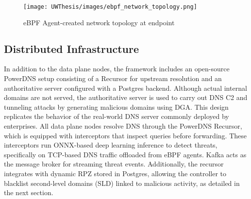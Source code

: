 \documentclass [11pt, proquest] {uwthesis}[2020/02/24]
\begin{document}
\begin{table}[htbp]
\centering
{}
\caption{eBPF Programs Managed by the eBPF Agent}
\label{sec:dp_kernel_prog_ty}
\end{table}

\begin{figure}[H]
\centering
\texttt{[image: UWThesis/images/ebpf\_network\_topology.png]}
\caption{eBPF Agent-created network topology at endpoint}
\label{sec:dp_eBPF_agent_net_topology}
\end{figure}

\subsection{Distributed Infrastructure}
In addition to the data plane nodes, the framework includes an open-source PowerDNS setup consisting of a Recursor for upstream resolution and an authoritative server configured with a Postgres backend. Although actual internal domains are not served, the authoritative server is used to carry out DNS C2 and tunneling attacks by generating malicious domains using DGA. This design replicates the behavior of the real-world DNS server commonly deployed by enterprises.
All data plane nodes resolve DNS through the PowerDNS Recursor, which is equipped with interceptors that inspect queries before forwarding. These interceptors run ONNX-based deep learning inference to detect threats, specifically on TCP-based DNS traffic offloaded from eBPF agents. Kafka acts as the message broker for streaming threat events. Additionally, the recursor integrates with dynamic RPZ stored in Postgres, allowing the controller to blacklist second-level domains (SLD) linked to malicious activity, as detailed in the next section.
\end{document}

